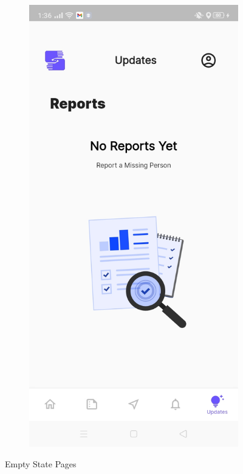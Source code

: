 \begin{figure}[!h]
\begin{subfigure}[c]{0.40\linewidth}
    \end{subfigure}
    \centering
    \begin{subfigure}[c]{0.40\linewidth}
        \centering
        \includegraphics[scale=0.15]{figures/Chapter4/Main/NoUpdates.jpg}
    \end{subfigure}
    \caption{Empty State Pages}
    \label{fig:submitReport}
\end{figure}

